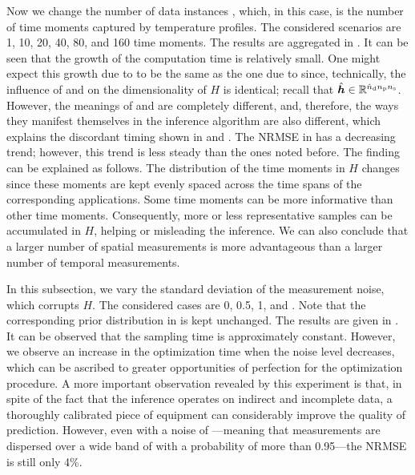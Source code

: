 
Now we change the number of data instances \ns, which, in this case, is the
number of time moments captured by temperature profiles. The considered
scenarios are 1, 10, 20, 40, 80, and 160 time moments. The results are
aggregated in . It can be seen that the growth of the
computation time is relatively small. One might expect this growth due to \ns to
be the same as the one due to \np since, technically, the influence of \np and
\ns on the dimensionality of $H$ is identical; recall that $\hat{\boldsymbol{h}} \in \mathbb{R}^{{\hat{n}_\mathrm{d}}
{n_\mathrm{p}} {n_\mathrm{s}}}$. However, the meanings of \np and \ns are completely different, and,
therefore, the ways they manifest themselves in the inference algorithm are also
different, which explains the discordant timing shown in 
and . The \ac{NRMSE} in  has
a decreasing trend; however, this trend is less steady than the ones noted
before. The finding can be explained as follows. The distribution of the time
moments in $H$ changes since these moments are kept evenly spaced across the
time spans of the corresponding applications. Some time moments can be more
informative than other time moments. Consequently, more or less representative
samples can be accumulated in $H$, helping or misleading the inference. We can
also conclude that a larger number of spatial measurements is more advantageous
than a larger number of temporal measurements.


In this subsection, we vary the standard deviation of the measurement noise,
which corrupts $H$. The considered cases are 0, 0.5, 1, and 
\cite{mesa-martinez2007}. Note that the corresponding prior distribution in
 is kept unchanged. The results are given in
. It can be observed that the sampling time is
approximately constant. However, we observe an increase in the optimization time
when the noise level decreases, which can be ascribed to greater opportunities
of perfection for the optimization procedure. A more important observation
revealed by this experiment is that, in spite of the fact that the inference
operates on indirect and incomplete data, a thoroughly calibrated piece of
equipment can considerably improve the quality of prediction. However, even with
a noise of ---meaning that measurements are dispersed over a wide
band of  with a probability of more than 0.95---the \ac{NRMSE} is
still only 4\%.

